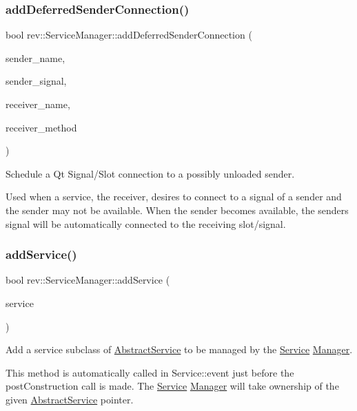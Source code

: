 \subsubsection{\texorpdfstring{addDeferredSenderConnection()}{addDeferredSenderConnection()}}
{\footnotesize\ttfamily bool rev\+::\+Service\+Manager\+::add\+Deferred\+Sender\+Connection (\begin{DoxyParamCaption}\item[{const Q\+String \&}]{sender\+\_\+name,  }\item[{const Q\+String \&}]{sender\+\_\+signal,  }\item[{const Q\+String \&}]{receiver\+\_\+name,  }\item[{const Q\+String \&}]{receiver\+\_\+method }\end{DoxyParamCaption})}



Schedule a Qt Signal/\+Slot connection to a possibly unloaded sender. 

Used when a service, the receiver, desires to connect to a signal of a sender and the sender may not be available. When the sender becomes available, the senders signal will be automatically connected to the receiving slot/signal. \mbox{\label{classrev_1_1_service_manager_ab8c309682969b2cb25bf900f31505bb0}} 
\subsubsection{\texorpdfstring{addService()}{addService()}}
{\footnotesize\ttfamily bool rev\+::\+Service\+Manager\+::add\+Service (\begin{DoxyParamCaption}\item[{\mbox{\hyperlink{classrev_1_1_abstract_service}{Abstract\+Service}} $\ast$}]{service }\end{DoxyParamCaption})\hspace{0.3cm}{\ttfamily [protected]}}



Add a service subclass of \mbox{\hyperlink{classrev_1_1_abstract_service}{Abstract\+Service}} to be managed by the \mbox{\hyperlink{classrev_1_1_service}{Service}} \mbox{\hyperlink{classrev_1_1_manager}{Manager}}. 

This method is automatically called in Service\+::event just before the post\+Construction call is made. The \mbox{\hyperlink{classrev_1_1_service}{Service}} \mbox{\hyperlink{classrev_1_1_manager}{Manager}} will take ownership of the given \mbox{\hyperlink{classrev_1_1_abstract_service}{Abstract\+Service}} pointer. \mbox{\label{classrev_1_1_service_manager_acb0c624f49261719e00e9ae99b383548}} 
